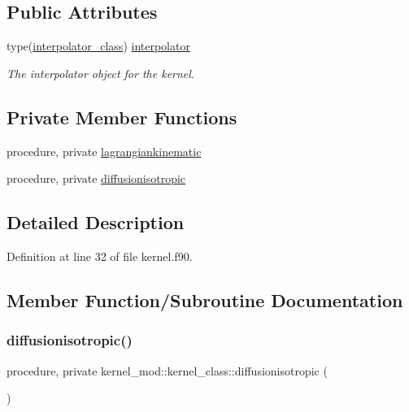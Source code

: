 \subsection*{Public Attributes}
\begin{DoxyCompactItemize}
\item 
type(\mbox{\hyperlink{structinterpolator__mod_1_1interpolator__class}{interpolator\+\_\+class}}) \mbox{\hyperlink{structkernel__mod_1_1kernel__class_a9ad0ab75e7c6a0eff5e24d9d5cd3a72d}{interpolator}}
\begin{DoxyCompactList}\small\item\em The interpolator object for the kernel. \end{DoxyCompactList}\end{DoxyCompactItemize}
\subsection*{Private Member Functions}
\begin{DoxyCompactItemize}
\item 
procedure, private \mbox{\hyperlink{structkernel__mod_1_1kernel__class_a955d89ed307afca4483f2ac06c03d8f6}{lagrangiankinematic}}
\item 
procedure, private \mbox{\hyperlink{structkernel__mod_1_1kernel__class_ade7a7d02085be709e7867735294e82a9}{diffusionisotropic}}
\end{DoxyCompactItemize}


\subsection{Detailed Description}


Definition at line 32 of file kernel.\+f90.



\subsection{Member Function/\+Subroutine Documentation}
\mbox{\label{structkernel__mod_1_1kernel__class_ade7a7d02085be709e7867735294e82a9}} 
\subsubsection{\texorpdfstring{diffusionisotropic()}{diffusionisotropic()}}
{\footnotesize\ttfamily procedure, private kernel\+\_\+mod\+::kernel\+\_\+class\+::diffusionisotropic (\begin{DoxyParamCaption}{ }\end{DoxyParamCaption})\hspace{0.3cm}{\ttfamily [private]}}



